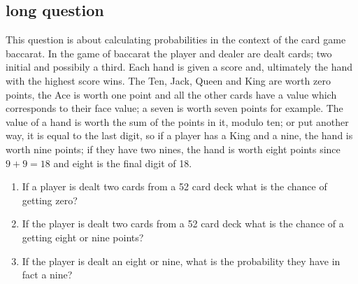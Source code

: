 \documentclass[11pt,a4paper]{scrartcl}
\begin{document}
\subsection*{long question}

This question is about calculating probabilities in the context of the
card game baccarat. In the game of baccarat the player and dealer are
dealt cards; two initial and possibily a third. Each hand is given a
score and, ultimately the hand with the highest score wins. The Ten,
Jack, Queen and King are worth zero points, the Ace is worth one point
and all the other cards have a value which corresponds to their face
value; a seven is worth seven points for example. The value of a hand
is worth the sum of the points in it, modulo ten; or put another way,
it is equal to the last digit, so if a player has a King and a nine,
the hand is worth nine points; if they have two nines, the hand is
worth eight points since $9+9=18$ and eight is the final digit of 18.
\begin{enumerate}
  \item If a player is dealt two cards from a 52 card deck what is the chance of getting zero?
  \item If the player is dealt two cards from a 52 card deck what is the chance of a getting eight or nine points?
  \item If the player is dealt an eight or nine, what is the probability they have in fact a nine?
\end{enumerate}
\end{document}
